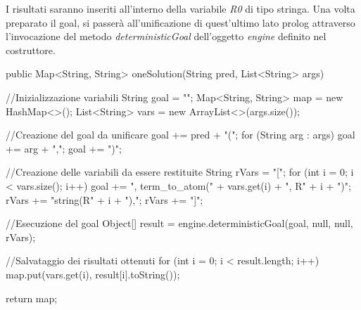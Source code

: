 I risultati saranno inseriti all'interno della variabile \emph{R0} di tipo stringa.
Una volta preparato il goal, si passerà all'unificazione di quest'ultimo lato prolog attraverso l'invocazione del metodo \emph{deterministicGoal} dell'oggetto \emph{engine} definito nel costruttore.

\begin{javacode}
   public Map<String, String> oneSolution(String pred, List<String> args){
   
   //Inizializzazione variabili
     String goal = "";
     Map<String, String> map = new HashMap<>();
     List<String> vars = new ArrayList<>(args.size());

   //Creazione del goal da unificare
     goal += pred + "(";
     for (String arg : args)
       goal += arg + ",";
     goal += ")";
       
   //Creazione delle variabili da essere restituite
     String rVars = "[";
     for (int i = 0; i < vars.size(); i++) {
       goal += ", term_to_atom(" + vars.get(i) + ", R" + i + ")";
       rVars += "string(R" + i + "),";
     }
     rVars += "]";

   //Esecuzione del goal
     Object[] result = engine.deterministicGoal(goal, null, null, rVars);
     
   //Salvataggio dei risultati ottenuti
     for (int i = 0; i < result.length; i++) {
       map.put(vars.get(i), result[i].toString());
     }
      
     return map;
   }
\end{javacode}